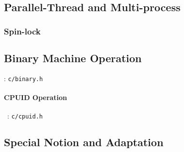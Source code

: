\subsection{Parallel-Thread and Multi-process}

\subsubsection{Spin-lock}

\subsection{Binary Machine Operation}
: \verb`c/binary.h`

\paragraph{CPUID Operation} \
: \verb`c/cpuid.h`


\subsection{Special Notion and Adaptation}







